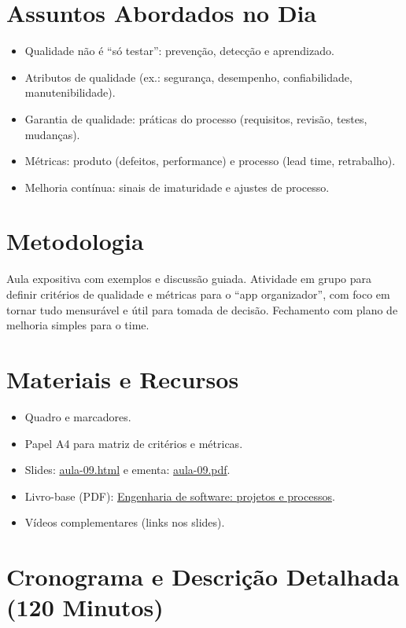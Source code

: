 \documentclass[12pt,a4paper]{article}
\begin{document}
\section{Assuntos Abordados no Dia}
\begin{itemize}[leftmargin=*,itemsep=0.25em]
  \item Qualidade não é ``só testar'': prevenção, detecção e aprendizado.
  \item Atributos de qualidade (ex.: segurança, desempenho, confiabilidade, manutenibilidade).
  \item Garantia de qualidade: práticas do processo (requisitos, revisão, testes, mudanças).
  \item Métricas: produto (defeitos, performance) e processo (lead time, retrabalho).
  \item Melhoria contínua: sinais de imaturidade e ajustes de processo.
\end{itemize}

\section{Metodologia}
Aula expositiva com exemplos e discussão guiada. Atividade em grupo para definir critérios de qualidade e métricas para o ``app organizador'', com foco em tornar tudo mensurável e útil para tomada de decisão. Fechamento com plano de melhoria simples para o time.

\section{Materiais e Recursos}
\begin{itemize}[leftmargin=*,itemsep=0.25em]
  \item Quadro e marcadores.
  \item Papel A4 para matriz de critérios e métricas.
  \item Slides: \href{aula-09.html}{aula-09.html} e ementa: \href{aula-09.pdf}{aula-09.pdf}.
  \item Livro-base (PDF): \href{../99-Materiais/Engenharia%20de%20software%20projetos%20e%20processos%20by%20Wilson%20de%20P%C3%A1dua%20Paula%20Filho%20.epub.pdf}{Engenharia de software: projetos e processos}.
  \item Vídeos complementares (links nos slides).
\end{itemize}

\section{Cronograma e Descrição Detalhada (120 Minutos)}
\end{document}
